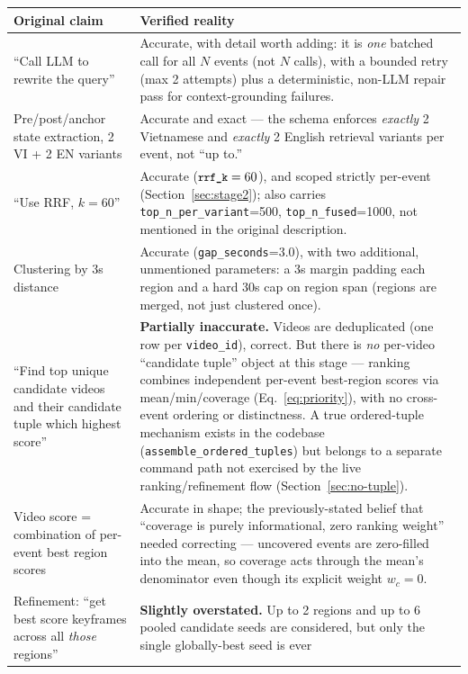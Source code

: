 \documentclass[11pt]{article}
\newcommand{\code}[1]{\texttt{\small #1}}
\newcommand{\corr}[1]{\textbf{\textcolor{red!60!black}{#1}}}
\begin{document}
\begin{longtable}{@{}p{}p{}@{}}
\toprule
\textbf{Original claim} & \textbf{Verified reality} \\
\midrule
\endhead
``Call LLM to rewrite the query'' &
  Accurate, with detail worth adding: it is \emph{one} batched call for all
  $N$ events (not $N$ calls), with a bounded retry (max 2 attempts) plus a
  deterministic, non-LLM repair pass for context-grounding failures. \\[4pt]
Pre/post/anchor state extraction, 2 VI + 2 EN variants &
  Accurate and exact --- the schema enforces \emph{exactly} 2 Vietnamese and
  \emph{exactly} 2 English retrieval variants per event, not ``up to.'' \\[4pt]
``Use RRF, $k=60$'' &
  Accurate ($\code{rrf\_k}=60$), and scoped strictly per-event
  (Section~\ref{sec:stage2}); also carries \code{top\_n\_per\_variant}=500,
  \code{top\_n\_fused}=1000, not mentioned in the original description. \\[4pt]
Clustering by 3s distance &
  Accurate (\code{gap\_seconds}=3.0), with two additional, unmentioned
  parameters: a 3s margin padding each region and a hard 30s cap on region
  span (regions are merged, not just clustered once). \\[4pt]
``Find top unique candidate videos and their candidate tuple which highest
score'' &
  \corr{Partially inaccurate.} Videos are deduplicated (one row per
  \code{video\_id}), correct. But there is \emph{no} per-video ``candidate
  tuple'' object at this stage --- ranking combines independent per-event
  best-region scores via mean/min/coverage
  (Eq.~\ref{eq:priority}), with no cross-event ordering or distinctness. A
  true ordered-tuple mechanism exists in the codebase
  (\code{assemble\_ordered\_tuples}) but belongs to a separate command path
  not exercised by the live ranking/refinement flow
  (Section~\ref{sec:no-tuple}). \\[4pt]
Video score = combination of per-event best region scores &
  Accurate in shape; the previously-stated belief that ``coverage is purely
  informational, zero ranking weight'' needed correcting --- uncovered events
  are zero-filled into the mean, so coverage acts through the mean's
  denominator even though its explicit weight $w_c=0$. \\[4pt]
Refinement: ``get best score keyframes across all \emph{those} regions'' &
  \corr{Slightly overstated.} Up to 2 regions and up to 6 pooled candidate
  seeds are considered, but only the single globally-best seed is ever

\end{longtable}
\end{document}
